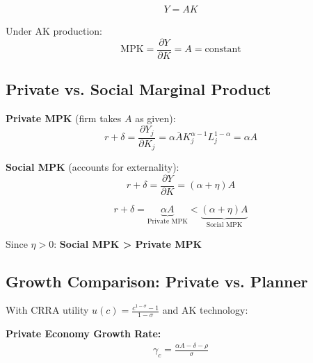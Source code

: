 \begin{resultbox}
\begin{align*}
\boxed{Y = AK} \tag{AK Production}
\end{align*}
\end{resultbox}

\medskip
\noindent Under AK production:
\[
\text{MPK} = \frac{\partial Y}{\partial K} = A = \text{constant}
\]

\clearpage

\subsection*{Private vs. Social Marginal Product}

\begin{derivationbox}
\textbf{Private MPK} (firm takes $A$ as given):
\[
r + \delta = \frac{\partial Y_j}{\partial K_j} = \alpha \bar{A} K_j^{\alpha-1} L_j^{1-\alpha} = \alpha A
\tag{Private MPK}
\]

\medskip
\textbf{Social MPK} (accounts for externality):
\[
r + \delta = \frac{\partial Y}{\partial K} = (\alpha + \eta) A
\tag{Social MPK}
\]
\end{derivationbox}

\begin{resultbox}
\[
\boxed{r + \delta = \underbrace{\alpha A}_{\text{Private MPK}} < \underbrace{(\alpha + \eta)A}_{\text{Social MPK}}}
\]
\end{resultbox}

\medskip
\begin{keyformulabox}
Since $\eta > 0$: \textbf{Social MPK > Private MPK}
\end{keyformulabox}

\clearpage

\subsection*{Growth Comparison: Private vs. Planner}

\medskip
\noindent With CRRA utility $u(c) = \frac{c^{1-\sigma} - 1}{1-\sigma}$ and AK technology:

\medskip
\noindent\textbf{Private Economy Growth Rate:}
\begin{align*}
\gamma_c = \frac{\alpha A - \delta - \rho}{\sigma}
\tag{Private Growth}
\end{align*}

